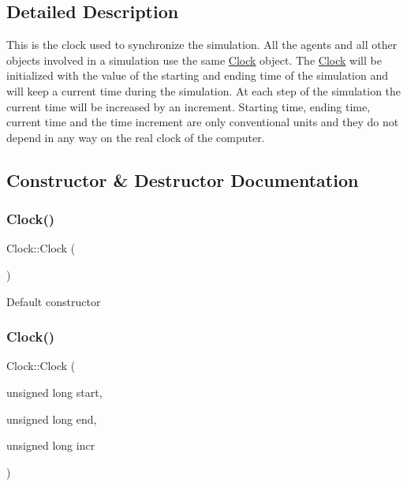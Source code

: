 \subsection{Detailed Description}
This is the clock used to synchronize the simulation. All the agents and all other objects involved in a simulation use the same \hyperlink{class_clock}{Clock} object. The \hyperlink{class_clock}{Clock} will be initialized with the value of the starting and ending time of the simulation and will keep a current time during the simulation. At each step of the simulation the current time will be increased by an increment. Starting time, ending time, current time and the time increment are only conventional units and they do not depend in any way on the real clock of the computer. 

\subsection{Constructor \& Destructor Documentation}
\mbox{\label{class_clock_adbc370eb6b5f8d01645cf440188160a8}} 
\subsubsection{\texorpdfstring{Clock()}{Clock()}\hspace{0.1cm}{\footnotesize\ttfamily [1/2]}}
{\footnotesize\ttfamily Clock\+::\+Clock (\begin{DoxyParamCaption}{ }\end{DoxyParamCaption})}

Default constructor \mbox{\label{class_clock_a89a798e152f8eba2f6eb80ec92b26ece}} 
\subsubsection{\texorpdfstring{Clock()}{Clock()}\hspace{0.1cm}{\footnotesize\ttfamily [2/2]}}
{\footnotesize\ttfamily Clock\+::\+Clock (\begin{DoxyParamCaption}\item[{unsigned long}]{start,  }\item[{unsigned long}]{end,  }\item[{unsigned long}]{incr }\end{DoxyParamCaption})}

